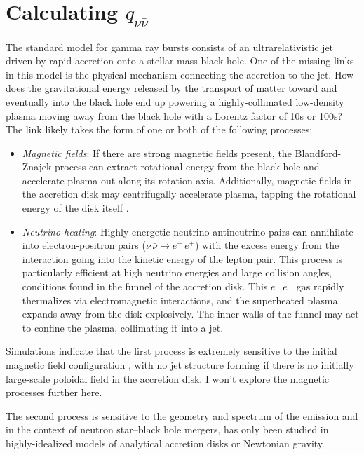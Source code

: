 \section{Calculating $q_{\nu \bar{\nu}}$}
\label{sec:q_algorithm}
The standard model for gamma ray bursts consists of an ultrarelativistic jet
driven by rapid accretion onto a stellar-mass black hole. One of the missing
links in this model is the physical mechanism connecting the accretion to the
jet. How does the gravitational energy released by the transport of matter
toward and eventually into the black hole end up powering a highly-collimated
low-density plasma moving away from the black hole with a Lorentz factor of
10s or 100s? The link likely takes the form of one or both of the following
processes:
\begin{itemize}
  \item \emph{Magnetic fields}: If there are strong magnetic fields present, the
    Blandford-Znajek process \citep{blan1977-blandford_znajek} can extract
    rotational energy from the black hole and accelerate plasma out along its
    rotation axis. Additionally, magnetic fields in the accretion disk may
    centrifugally accelerate plasma, tapping the rotational energy of the
    disk itself \citep{blan1982-blandford_payne}.
  \item \emph{Neutrino heating}: Highly energetic neutrino-antineutrino pairs
    can annihilate into electron-positron pairs
    ($\nu \, \bar{\nu} \rightarrow e^{-} \, e^{+}$)
    with the excess energy from the interaction going into the kinetic energy of the
    lepton pair.
    This process is particularly efficient at high neutrino energies and large
    collision angles, conditions found in the funnel of the accretion disk.
    This $e^{-}\,e^{+}$ gas rapidly thermalizes via electromagnetic interactions,
    and the superheated plasma expands away from the disk explosively. The inner
    walls of the funnel may act to confine the plasma, collimating it into a jet.
\end{itemize}

Simulations indicate that the first process is extremely sensitive to the
initial magnetic field configuration \citep{beck2008-mag_geometry},
with no jet structure forming if there is
no initially large-scale poloidal field in the accretion disk.
I won't explore the magnetic processes further here.

The second process is sensitive to the geometry and spectrum of the emission
and in the context of neutron star--black hole mergers, has only been studied
in highly-idealized models of analytical accretion disks or Newtonian gravity.

